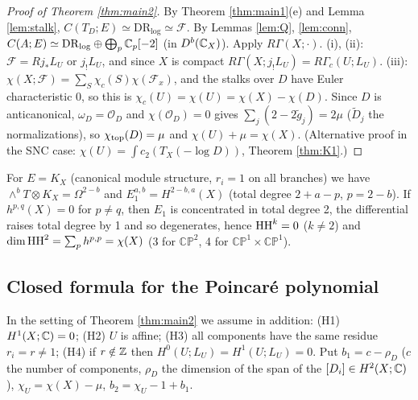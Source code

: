 \begin{proof}[Proof of Theorem \ref{thm:main2}]
By Theorem \ref{thm:main1}(e) and Lemma \ref{lem:stalk}, $C(T_D;E)\simeq\mathrm{DR}_{\log}\simeq\mathcal F$. By Lemmas \ref{lem:Q}, \ref{lem:conn}, $C(A;E)\simeq\mathrm{DR}_{\log}\oplus\bigoplus_p\mathbb C_p[-2]$ (in $D^b(\mathbb C_X)$). Apply $R\Gamma(X;\cdot)$. (i), (ii): $\mathcal F=Rj_*L_U$ or $j_!L_U$, and since $X$ is compact $R\Gamma(X;j_!L_U)=R\Gamma_c(U;L_U)$. (iii): $\chi(X;\mathcal F)=\sum_S\chi_c(S)\chi(\mathcal F_x)$, and the stalks over $D$ have Euler characteristic 0, so this is $\chi_c(U)=\chi(U)=\chi(X)-\chi(D)$. Since $D$ is anticanonical, $\omega_D=\mathcal O_D$ and $\chi(\mathcal O_D)=0$ gives $\sum_j(2-2\tilde g_j)=2\mu$ ($\tilde D_j$ the normalizations), so $\chi_{\rm top}(D)=\mu$ and $\chi(U)+\mu=\chi(X)$. (Alternative proof in the SNC case: $\chi(U)=\int c_2(T_X(-\log D))$, Theorem \ref{thm:K1}.) \qedhere
\end{proof}

\begin{prop}[$r_i=1$: $E=K_X$]\tP\label{prop:KX}
For $E=K_X$ (canonical module structure, $r_i=1$ on all branches) we have $\wedge^bT\otimes K_X=\Omega^{2-b}$ and $E_1^{a,b}=H^{2-b,a}(X)$ (total degree $2+a-p$, $p=2-b$). If $h^{p,q}(X)=0$ for $p\ne q$, then $E_1$ is concentrated in total degree 2, the differential raises total degree by 1 and so degenerates, hence $\mathrm{HH}^k=0$ ($k\ne2$) and $\dim\mathrm{HH}^2=\sum_ph^{p,p}=\chi(X)$ (3 for $\mathbb{CP}^2$, 4 for $\mathbb{CP}^1\times\mathbb{CP}^1$).
\end{prop}

\subsection{Closed formula for the Poincar\'e polynomial}
In the setting of Theorem \ref{thm:main2} we assume in addition: (H1) $H^1(X;\mathbb C)=0$; (H2) $U$ is affine; (H3) all components have the same residue $r_i=r\ne1$; (H4) if $r\notin\mathbb Z$ then $H^0(U;L_U)=H^1(U;L_U)=0$. Put $b_1=c-\rho_D$ ($c$ the number of components, $\rho_D$ the dimension of the span of the $[D_i]\in H^2(X;\mathbb C)$), $\chi_U=\chi(X)-\mu$, $b_2=\chi_U-1+b_1$.

